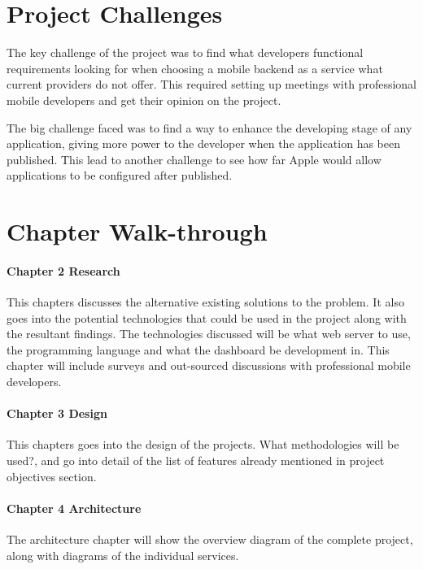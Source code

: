 \section{Project Challenges}

The key challenge of the project was to find what developers functional requirements looking for when choosing a mobile backend as a service what current providers do not offer. This required setting up meetings with professional mobile developers and get their opinion on the project.

The big challenge faced was to find a way to enhance the developing stage of any application, giving more power to the developer when the application has been published. This lead to another challenge to see how far Apple would allow applications to be configured after published.

\section{Chapter Walk-through}

\paragraph{Chapter 2 Research}

This chapters discusses the alternative existing solutions to the problem. It also goes into the potential technologies that could be used in the project along with the resultant findings. The technologies discussed will be what web server to use, the programming language and what the dashboard be development in. This chapter will include surveys and out-sourced discussions with professional mobile developers.


\paragraph{Chapter 3 Design}

This chapters goes into the design of the projects. What methodologies will be used?, and go into detail of the list of features already mentioned in project objectives section.

\paragraph{Chapter 4 Architecture}

The architecture chapter will show the overview diagram of the complete project, along with diagrams of the individual services.

